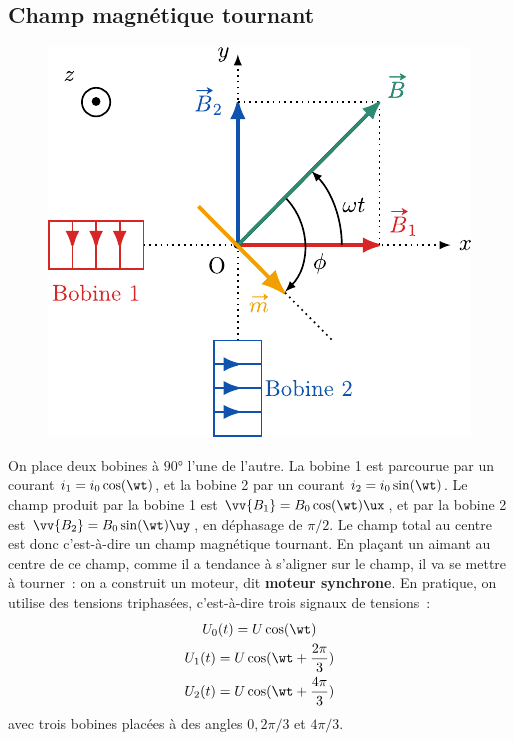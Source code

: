 \documentclass[../../main/main.tex]{subfiles}
\begin{document}
\subsection{Champ magnétique tournant}
\label{ssec:chptournant}
\begin{figure}[H]
	\centering
	\includegraphics[scale=1]{chptournant}
	\label{fig:chptournant}
\end{figure}

On place deux bobines à $\ang{90}$ l'une de l'autre. La bobine 1 est parcourue
par un courant $i_1 = i_0\cos(\wt)$, et la bobine 2 par un courant $i_2 =
	i_0\sin(\wt)$.
Le champ produit par la bobine 1 est $\vv{B_1} = B_0\cos(\wt)\ux$, et par la
bobine 2 est $\vv{B_2} = B_0\sin(\wt)\uy$, en déphasage de $\pi/2$. Le champ
total au centre est donc
\psw{%
	\[
		\vv{B} = B_0(\cos(\wt)\ux + \sin(\wt) \uy)
	\]
}%
c'est-à-dire un champ magnétique tournant. En plaçant un aimant au centre de ce
champ, comme il a tendance à s'aligner sur le champ, il va se mettre à tourner~:
on a construit un moteur, dit \textbf{moteur synchrone}.
\bigbreak
En pratique, on utilise des tensions triphasées, c'est-à-dire trois signaux de
tensions~:
\begin{gather*}
	U_0(t) = U\cos(\wt)
	\\
	U_1(t) = U\cos( \wt + \frac{2\pi}{3} )
	\\
	U_2(t) = U\cos( \wt + \frac{4\pi}{3} )
\end{gather*}
avec trois bobines placées à des angles $0, 2\pi/3$ et $4\pi/3$.
\end{document}
